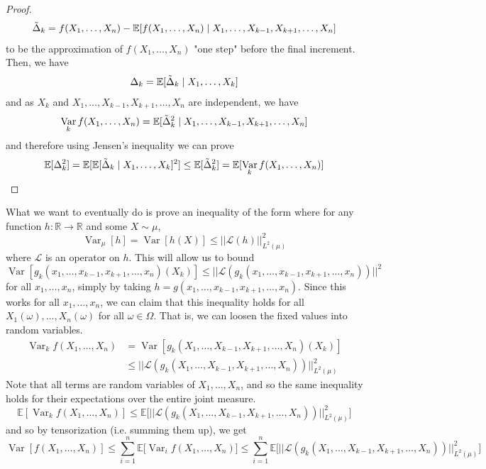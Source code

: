 \documentclass{article}
\DeclareMathOperator{\Var}{Var}
\begin{document}
\begin{proof}
  \[\Tilde{\Delta}_k = f(X_1, \ldots, X_n) - \mathbb{E}[f(X_1, \ldots, X_n) \mid X_1, \ldots, X_{k-1}, X_{k+1}, \ldots, X_n]\]
  to be the approximation of $f(X_1, \ldots, X_n)$ "one step" before the final increment. Then, we have 
  \[\Delta_k = \mathbb{E}[\Tilde{\Delta}_k \mid X_1, \ldots, X_k]\]
  and as $X_k$ and $X_1, \ldots, X_{k-1}, X_{k+1}, \ldots, X_n$ are independent, we have 
  \[\Var_k f(X_1, \ldots, X_n) = \mathbb{E}[\Tilde{\Delta}_k^2 \mid X_1, \ldots, X_{k-1}, X_{k+1}, \ldots, X_n] \]
  and therefore using Jensen's inequality we can prove 
  \[\mathbb{E}[\Delta_k^2] = \mathbb{E}[\mathbb{E}[ \Tilde{\Delta}_k \mid X_1, \ldots, X_k]^2 ] \leq \mathbb{E}[\Tilde{\Delta}_k^2] = \mathbb{E}[\Var_k f(X_1, \ldots, X_n)]\]
  \end{proof}

  What we want to eventually do is prove an inequality of the form where for any function $h: \mathbb{R} \rightarrow \mathbb{R}$ and some $X \sim \mu$, 
  \[\Var_\mu[h] = \Var [h(X)] \leq ||\mathcal{L}(h)||^2_{L^2 (\mu)}\]
  where $\mathcal{L}$ is an operator on $h$. This will allow us to bound 
  \[\Var [g_k (x_1, \ldots, x_{k-1}, x_{k+1}, \ldots, x_n)(X_k)] \leq ||\mathcal{L}(g_k (x_1, \ldots, x_{k-1}, x_{k+1}, \ldots, x_n))||^2\]
  for all $x_1, \ldots, x_n$, simply by taking $h = g(x_1, \ldots, x_{k-1}, x_{k+1}, \ldots, x_n)$. Since this works for all $x_1, \ldots, x_n$, we can claim that this inequality holds for all $X_1 (\omega), \ldots, X_n (\omega)$ for all $\omega \in \Omega$. That is, we can loosen the fixed values into random variables. 
  \begin{align*}
      \Var_{k} f(X_1, \ldots, X_n) & = \Var[g_k (X_1, \ldots, X_{k-1}, X_{k+1}, \ldots, X_n)(X_k)] \\
      & \leq || \mathcal{L}(g_k (X_1, \ldots, X_{k-1}, X_{k+1}, \ldots, X_n))||^2_{L^2 (\mu)} 
  \end{align*}
  Note that all terms are random variables of $X_1, \ldots, X_n$, and so the same inequality holds for their expectations over the entire joint measure. 
  \[\mathbb{E}[ \Var_{k} f(X_1, \ldots, X_n) ] \leq \mathbb{E} \big[ || \mathcal{L}(g_k (X_1, \ldots, X_{k-1}, X_{k+1}, \ldots, X_n))||^2_{L^2 (\mu)} \big] \]
  and so by tensorization (i.e. summing them up), we get 
  \[\Var[f(X_1, \ldots, X_n)] \leq \sum_{i=1}^n \mathbb{E} \big[ \Var_i f(X_1, \ldots, X_n) \big] \leq \sum_{i=1}^n \mathbb{E} \big[ || \mathcal{L}(g_k (X_1, \ldots, X_{k-1}, X_{k+1}, \ldots, X_n))||^2_{L^2 (\mu)} \big] \]
\end{document}
